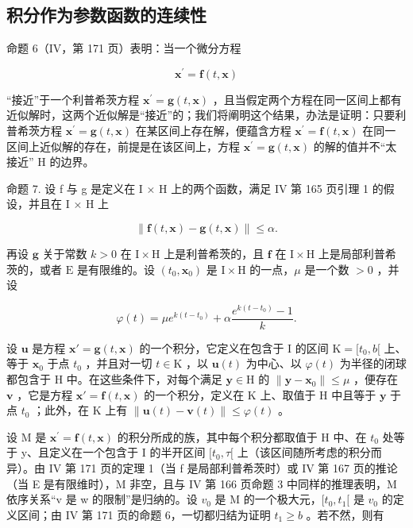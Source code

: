 \subsection{积分作为参数函数的连续性}

命题 6（IV，第 171 页）表明：当一个微分方程

\[
\mathbf {x} ^ {\prime} = \mathbf {f} (t, \mathbf {x})
\]

“接近”于一个利普希茨方程 \(\mathbf{x}^{\prime} = \mathbf{g}(t, \mathbf{x})\) ，且当假定两个方程在同一区间上都有近似解时，这两个近似解是“接近”的；我们将阐明这个结果，办法是证明：只要利普希茨方程 \(\mathbf{x}^{\prime} = \mathbf{g}(t, \mathbf{x})\) 在某区间上存在解，便蕴含方程 \(\mathbf{x}^{\prime} = \mathbf{f}(t, \mathbf{x})\) 在同一区间上近似解的存在，前提是在该区间上，方程 \(\mathbf{x}^{\prime} = \mathbf{g}(t, \mathbf{x})\) 的解的值并不“太接近” H 的边界。

命题 7. 设 f 与 g 是定义在 I × H 上的两个函数，满足 IV 第 165 页引理 1 的假设，并且在 I × H 上

\[
\left\| \mathbf {f} (t, \mathbf {x}) - \mathbf {g} (t, \mathbf {x}) \right\| \leqslant \alpha .\tag{16}
\]

再设 \(\mathbf{g}\) 关于常数 \(k > 0\) 在 \(\mathrm{I} \times \mathrm{H}\) 上是利普希茨的，且 \(\mathbf{f}\) 在 \(\mathrm{I} \times \mathrm{H}\) 上是局部利普希茨的，或者 \(\mathrm{E}\) 是有限维的。设 \((t_0, \mathbf{x}_0)\) 是 \(\mathrm{I} \times \mathrm{H}\) 的一点，\(\mu\) 是一个数 \(>0\) ，并设

\[
\varphi (t) = \mu e ^ {k (t - t _ {0})} + \alpha \frac {e ^ {k (t - t _ {0})} - 1}{k}.
\]

设 \(\mathbf{u}\) 是方程 \(\mathbf{x}' = \mathbf{g}(t, \mathbf{x})\) 的一个积分，它定义在包含于 I 的区间 \(\mathrm{K} = [t_0, b[\) 上、等于 \(\mathbf{x}_0\) 于点 \(t_0\) ，并且对一切 \(t \in \mathrm{K}\) ，以 \(\mathbf{u}(t)\) 为中心、以 \(\varphi(t)\) 为半径的闭球都包含于 H 中。在这些条件下，对每个满足 \(\mathbf{y} \in \mathrm{H}\) 的 \(\| \mathbf{y} - \mathbf{x}_0 \| \leqslant \mu\) ，便存在 \(\mathbf{v}\) ，它是方程 \(\mathbf{x}' = \mathbf{f}(t, \mathbf{x})\) 的一个积分，定义在 K 上、取值于 H 中且等于 \(\mathbf{y}\) 于点 \(t_0\) ；此外，在 K 上有 \(\| \mathbf{u}(t) - \mathbf{v}(t) \| \leqslant \varphi(t)\) 。

设 M 是 \(\mathbf{x}^{\prime} = \mathbf{f}(t, \mathbf{x})\) 的积分所成的族，其中每个积分都取值于 H 中、在 \(t_{0}\) 处等于 y、且定义在一个包含于 I 的半开区间 \([t_{0}, \tau[\) 上（该区间随所考虑的积分而异）。由 IV 第 171 页的定理 1（当 f 是局部利普希茨时）或 IV 第 167 页的推论（当 E 是有限维时），M 非空，且与 IV 第 166 页命题 3 中同样的推理表明，M 依序关系“v 是 w 的限制”是归纳的。设 \(v_{0}\) 是 M 的一个极大元，\([t_{0}, t_{1}[\) 是 \(v_{0}\) 的定义区间；由 IV 第 171 页的命题 6，一切都归结为证明 \(t_{1} \geqslant b\) 。若不然，则有

